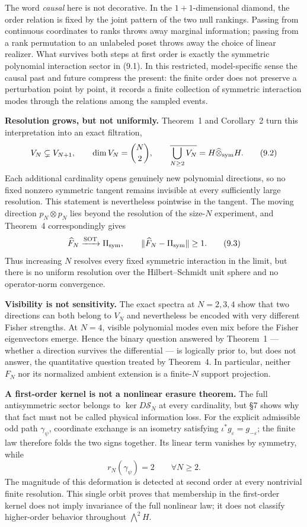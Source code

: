 \documentclass[11pt]{article}
\begin{document}
The word \emph{causal} here is not decorative. In the \(1+1\)-dimensional diamond, the order relation is fixed by the joint pattern of the two null rankings. Passing from continuous coordinates to ranks throws away marginal information; passing from a rank permutation to an unlabeled poset throws away the choice of linear realizer. What survives both steps at first order is exactly the symmetric polynomial interaction sector in (9.1). In this restricted, model-specific sense the causal past and future compress the present: the finite order does not preserve a perturbation point by point, it records a finite collection of symmetric interaction modes through the relations among the sampled events.

\textbf{Resolution grows, but not uniformly.} Theorem~1 and Corollary~2 turn this interpretation into an exact filtration, \[ V_N\subsetneq V_{N+1}, \qquad \dim V_N=\binom N2, \qquad \overline{\bigcup_{N\ge2}V_N} =H\widehat\otimes_{\rm sym}H. \tag{9.2} \] Each additional cardinality opens genuinely new polynomial directions, so no fixed nonzero symmetric tangent remains invisible at every sufficiently large resolution. This statement is nevertheless pointwise in the tangent. The moving direction \(p_N\otimes p_N\) lies beyond the resolution of the size-\(N\) experiment, and Theorem~4 correspondingly gives \[ \widehat F_N\xrightarrow{\rm SOT}\Pi_{\rm sym}, \qquad \|\widehat F_N-\Pi_{\rm sym}\|\ge1. \tag{9.3} \] Thus increasing \(N\) resolves every fixed symmetric interaction in the limit, but there is no uniform resolution over the Hilbert--Schmidt unit sphere and no operator-norm convergence.

\textbf{Visibility is not sensitivity.} The exact spectra at \(N=2,3,4\) show that two directions can both belong to \(V_N\) and nevertheless be encoded with very different Fisher strengths. At \(N=4\), visible polynomial modes even mix before the Fisher eigenvectors emerge. Hence the binary question answered by Theorem~1 --- whether a direction survives the differential --- is logically prior to, but does not answer, the quantitative question treated by Theorem~4. In particular, neither \(F_N\) nor its normalized ambient extension is a finite-\(N\) support projection.

\textbf{A first-order kernel is not a nonlinear erasure theorem.} The full antisymmetric sector belongs to \(\ker D\mathscr S_N\) at every cardinality, but \S7 shows why that fact must not be called physical information loss. For the explicit admissible odd path \(\gamma_\psi\), coordinate exchange is an isometry satisfying \(\iota^*g_\varepsilon=g_{-\varepsilon}\); the finite law therefore folds the two signs together. Its linear term vanishes by symmetry, while \[ r_N(\gamma_\psi)=2\qquad\forall N\ge2. \tag{9.4} \] The magnitude of this deformation is detected at second order at every nontrivial finite resolution. This single orbit proves that membership in the first-order kernel does not imply invariance of the full nonlinear law; it does not classify higher-order behavior throughout \(\bigwedge^2H\).
\end{document}
